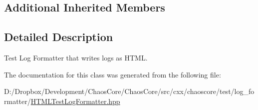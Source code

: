 \subsection*{Additional Inherited Members}


\subsection{Detailed Description}
Test Log Formatter that writes logs as H\+T\+M\+L. 

The documentation for this class was generated from the following file\+:\begin{DoxyCompactItemize}
\item 
D\+:/\+Dropbox/\+Development/\+Chaos\+Core/\+Chaos\+Core/src/cxx/chaoscore/test/log\+\_\+formatter/\hyperlink{_h_t_m_l_test_log_formatter_8hpp}{H\+T\+M\+L\+Test\+Log\+Formatter.\+hpp}\end{DoxyCompactItemize}
